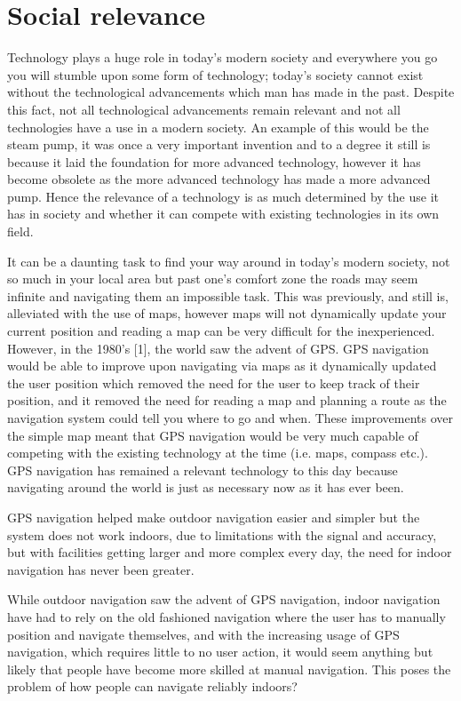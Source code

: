 \section{Social relevance}
Technology plays a huge role in today's modern society and everywhere you go you will stumble upon some form of technology; today's society cannot exist without the technological advancements which man has made in the past.
Despite this fact, not all technological advancements remain relevant and not all technologies have a use in a modern society. An example of this would be the steam pump, it was once a very important invention and to a degree it still is because it laid the foundation for more advanced technology, however it has become obsolete as the more advanced technology has made a more advanced pump. Hence the relevance of a technology is as much determined by the use it has in society and whether it can compete with existing technologies in its own field.

It can be a daunting task to find your way around in today's modern society, not so much in your local area but past one's comfort zone the roads may seem infinite and navigating them an impossible task. This was previously, and still is, alleviated with the use of maps, however maps will not dynamically update your current position and reading a map can be very difficult for the inexperienced. However, in the 1980's [1], the world saw the advent of GPS. GPS navigation would be able to improve upon navigating via maps as it dynamically updated the user position which removed the need for the user to keep track of their position, and it removed the need for reading a map and planning a route as the navigation system could tell you where to go and when. These improvements over the simple map meant that GPS navigation would be very much capable of competing with the existing technology at the time (i.e. maps, compass etc.). GPS navigation has remained a relevant technology to this day because navigating around the world is just as necessary now as it has ever been.

GPS navigation helped make outdoor navigation easier and simpler but the system does not work indoors, due to limitations with the signal and accuracy, but with facilities getting larger and more complex every day, the need for indoor navigation has never been greater.

While outdoor navigation saw the advent of GPS navigation, indoor navigation have had to rely on the old fashioned navigation where the user has to manually position and navigate themselves, and with the increasing usage of GPS navigation, which requires little to no user action, it would seem anything but likely that people have become more skilled at manual navigation. This poses the problem of how people can navigate reliably indoors?

